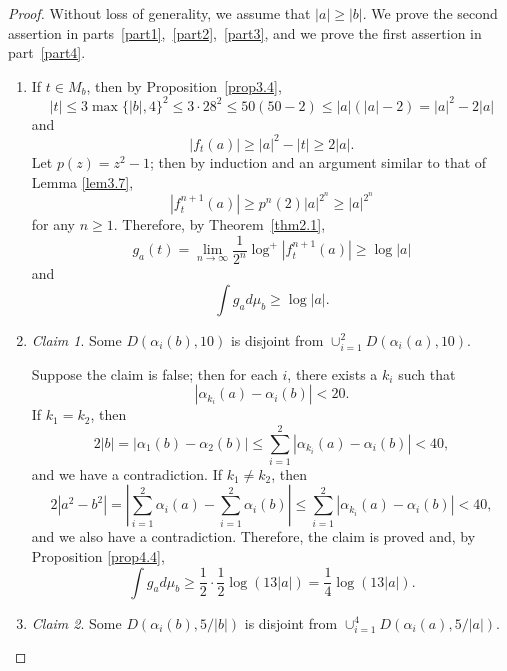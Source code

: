 \documentclass[10pt,a4paper]{amsart}
\numberwithin{equation}{section}
\theoremstyle{plain}
\theoremstyle{definition}
\theoremstyle{remark}
\newtheorem*{claim*}{Claim}
\begin{document}
\begin{proof}
Without loss of generality, we assume that $|a|\geq|b|$. We prove
the second assertion in parts~\eqref{part1},~\eqref{part2},~\eqref{part3},  and we prove the first assertion in part~\eqref{part4}.

\begin{enumerate}[wide]
  \item\label{part1}
  If $t\in M_{b}$, then
by Proposition~\ref{prop3.4},
\[
|t|\leq3\max\{|b|,4\}^{2}\leq3\cdot28^{2}\leq50(50-2)\leq|a|(|a|-2)=|a|^{2}-2|a|
\]
and
\[
|f_{t}(a)|\geq|a|^{2}-|t|\geq2|a|.
\]
Let $p(z)=z^{2}-1$; then by induction and an argument similar to that of Lemma
\ref{lem3.7},
\[
\left|f_{t}^{n+1}(a)\right|\geq p^{n}(2)|a|^{2^{n}}\geq|a|^{2^{n}}
\]
for any $n\geq1$. Therefore, by Theorem~\ref{thm2.1},
\[
g_{a}(t)=\lim_{n\to\infty}\frac{1}{2^{n}}\log^{+}\left|f_{t}^{n+1}(a)\right|\geq\log|a|
\]
and
\[
\int g_{a}d\mu_{b}\geq\log|a|.
\]

\item\label{part2}

\begin{claim*}
  Some $D(\alpha_{i}(b),10)$ is disjoint from $\cup_{i=1}^{2}D(\alpha_{i}(a),10)$.
\end{claim*}

Suppose the claim is false; then for each $i$, there exists a $k_{i}$ such that
\[
\left|\alpha_{k_{i}}(a)-\alpha_{i}(b)\right|<20.
\]
If $k_{1}=k_{2}$, then
\[
2|b|=|\alpha_{1}(b)-\alpha_{2}(b)|\leq\sum_{i=1}^{2}|\alpha_{k_{i}}(a)-\alpha_{i}(b)|<40,
\]
and we have a contradiction. If $k_{1}\neq k_{2}$, then
\[
2\left|a^{2}-b^{2}\right|=\left|\sum_{i=1}^{2}\alpha_{i}(a)-\sum_{i=1}^{2}\alpha_{i}(b)\right|\leq\sum_{i=1}^{2}\left|\alpha_{k_{i}}(a)-\alpha_{i}(b)\right|<40,
\]
and we also have a contradiction. Therefore, the claim is proved and, by Proposition
\ref{prop4.4},
\[
\int g_{a}d\mu_{b}\geq\frac{1}{2}\cdot\frac{1}{2}\log(13|a|)=\frac{1}{4}\log(13|a|).
\]

\item\label{part3}
  
\begin{claim*} Some $D(\alpha_{i}(b),5/|b|)$ is disjoint from $\cup_{i=1}^{4}D(\alpha_{i}(a),5/|a|)$.
\end{claim*}


\end{enumerate}
\end{proof}
\end{document}
